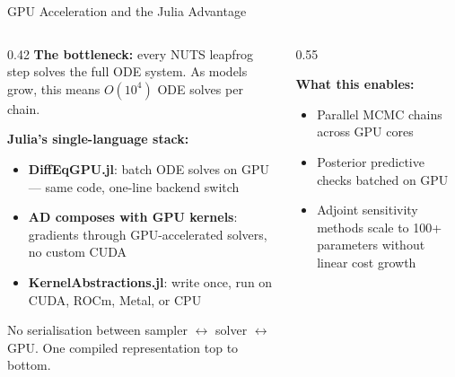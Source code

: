 \documentclass[aspectratio=169]{beamer}
\begin{document}
\begin{frame}[noframenumbering]{GPU Acceleration and the Julia Advantage}
		\scriptsize
	\begin{columns}[T]
		\begin{column}{0.42\textwidth}
			\textbf{The bottleneck:} every NUTS leapfrog step solves the full ODE system. As models grow, this means $O(10^4)$ ODE solves per chain.

			\bigskip
			\textbf{Julia's single-language stack:}
			\begin{itemize}\itemsep4pt
				\item \textbf{DiffEqGPU.jl}: batch ODE solves on GPU --- same code, one-line backend switch
				\item \textbf{AD composes with GPU kernels}: gradients through GPU-accelerated solvers, no custom CUDA
				\item \textbf{KernelAbstractions.jl}: write once, run on CUDA, ROCm, Metal, or CPU
			\end{itemize}

			\bigskip
			{\small No serialisation between sampler $\leftrightarrow$ solver $\leftrightarrow$ GPU. One compiled representation top to bottom.}
		\end{column}
		\begin{column}{0.55\textwidth}
			\centering

			\bigskip
			\textbf{What this enables:}
			\begin{itemize}\itemsep3pt
				\item Parallel MCMC chains across GPU cores
				\item Posterior predictive checks batched on GPU
				\item Adjoint sensitivity methods scale to 100+ parameters without linear cost growth
			\end{itemize}
		\end{column}
	\end{columns}
\end{frame}
\end{document}
